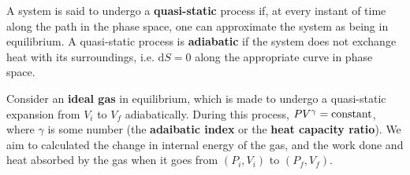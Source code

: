 \documentclass[letter-paper]{tufte-book}
\newenvironment{example}[1][Example]{\begin{trivlist}
\item[\hskip \labelsep {\bfseries #1}]}{\end{trivlist}}
\newcommand\Def[1]{\textbf{#1}}
\begin{document}
A system is said to undergo a \Def{quasi-static} process if, at every instant of
time along the path in the phase space, one can approximate the system as being
in equilibrium. A quasi-static process is \Def{adiabatic} if the system does not
exchange heat with its surroundings, i.e. $\mathrm{d}S = 0$ along the
appropriate curve in phase space.

\begin{example}[Ideal gas]
Consider an \Def{ideal gas} in equilibrium, which is made to
undergo a quasi-static expansion from $V_i$ to $V_f$ adiabatically. During this
process, $PV^\gamma = \textnormal{constant}$, where $\gamma$ is some number (the
\Def{adaibatic index} or the \Def{heat capacity ratio}). We aim to calculated
the change in internal energy of the gas, and the work done and heat absorbed by
the gas when it goes from $(P_i, V_i)$ to $(P_f, V_f)$.

\end{example}







\mainmatter




%


\end{document}
